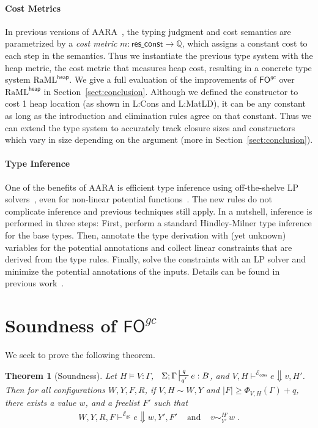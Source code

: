 \documentclass{easychair}
\newtheorem{theorem}{Theorem}
\newcommand{\ms}[1]{\ensuremath{\mathsf{#1}}}
\newcounter{rule}
\newcommand{\veq}[4]{#3 \sim^{#1}_{#2} #4}
\newcommand{\fogc}{\ms{FO}^{gc}}
\newcommand{\foheap}{\text{RaML}^{\ms{heap}}}
\newcommand{\gcSem}{\ensuremath{\mathcal{E}_{\ms{gc}}}}
\theoremstyle{definition}
\begin{document}
\paragraph{Cost Metrics}
In previous versions of AARA~\cite{Jost10,HoffmannAH10}, the typing judgment and cost semantics
are parametrized by a \emph{cost metric} 
$m : \ms{res\_const \to \mathbb{Q}}$, which assigns a constant cost to 
each step in the semantics. Thus we instantiate the previous type system with the heap metric,
the cost metric that measures heap cost, resulting in a concrete type system $\foheap$.
We give a full evaluation of the improvements of $\fogc$ over $\foheap$ in Section~\ref{sect:conclusion}.
Although we defined the constructor to cost
1 heap location (as shown in L:Cons and L:MatLD), it can be any constant as long as the introduction
and elimination rules agree on that constant. Thus we can extend the type system to accurately track
closure sizes and constructors which vary in size depending on the argument (more in 
Section~\ref{sect:conclusion}).

\paragraph{Type Inference} One of the benefits of AARA is efficient type
inference using off-the-shelve LP solvers~\cite{Jost03}, even for
non-linear potential functions~\cite{HoffmannAH10,HoffmannW15}. The
new rules do not complicate inference and previous techniques still
apply. In a nutshell, inference is performed in three steps: First,
perform a standard Hindley-Milner type inference for the base
types. Then, annotate the type derivation with (yet unknown) variables
for the potential annotations and collect linear constraints that are
derived from the type rules. Finally, solve the constraints with an LP
solver and minimize the potential annotations of the inputs. Details
can be found in previous work~\cite{Jost03,HoffmannW15}.



\section{Soundness of \texorpdfstring{$\fogc$}{ }}

We seek to prove the following theorem.

\begin{theorem}[Soundness]
\label{itm:soundness} Let $H \vDash V {:} \Gamma$, $\;\; \Sigma; \Gamma \sststile{q'}{q} e : B$,
and $V,H \vdash^{\mathcal{E}_{\ms{oper}}} e \Downarrow v, H'$.
Then for all configurations $W,Y,F,R$,
if $V,H \sim W,Y$ and $|F| \ge \Phi_{V,H}(\Gamma) + q$,
there exists a value $w$, and a freelist $F'$ such that
$$
\begin{array}{ccc}
	W,Y,R,F \vdash^{\gcSem} e \Downarrow w, Y', F'  & \text{ and } & \veq{H'}{Y'}{v}{w} \; .
\end{array}
$$
\end{theorem}
\end{document}
